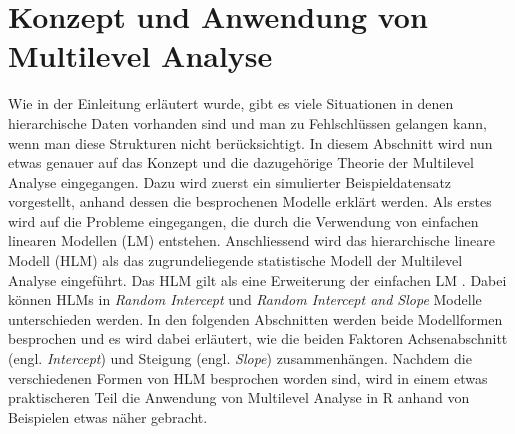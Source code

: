 \documentclass[12pt, a4paper]{article}\usepackage[]{graphicx}\usepackage[]{color}
\begin{document}
\section{Konzept und Anwendung von Multilevel Analyse}
Wie in der Einleitung erläutert wurde, gibt es viele Situationen in denen hierarchische Daten vorhanden sind und man zu Fehlschlüssen gelangen kann, wenn man diese Strukturen nicht berücksichtigt. In diesem Abschnitt wird nun etwas genauer auf das Konzept und die dazugehörige Theorie der Multilevel Analyse eingegangen. Dazu wird zuerst ein simulierter Beispieldatensatz vorgestellt, anhand dessen die besprochenen Modelle erklärt werden. Als erstes wird auf die Probleme eingegangen, die durch die Verwendung von einfachen linearen Modellen (LM) entstehen. Anschliessend wird das hierarchische lineare Modell (HLM) als das zugrundeliegende statistische Modell der Multilevel Analyse eingeführt. Das HLM gilt als eine Erweiterung der einfachen LM \citep{SnijdersTomA.B2012Ma:a}. Dabei können HLMs in \textit{Random Intercept} und \textit{Random Intercept and Slope} Modelle unterschieden werden. In den folgenden Abschnitten werden beide Modellformen besprochen und es wird dabei erläutert, wie die beiden Faktoren Achsenabschnitt (engl. \textit{Intercept}) und Steigung (engl. \textit{Slope}) zusammenhängen. Nachdem die verschiedenen Formen von HLM besprochen worden sind, wird in einem etwas praktischeren Teil die Anwendung von Multilevel Analyse in R anhand von Beispielen etwas näher gebracht.
\end{document}
